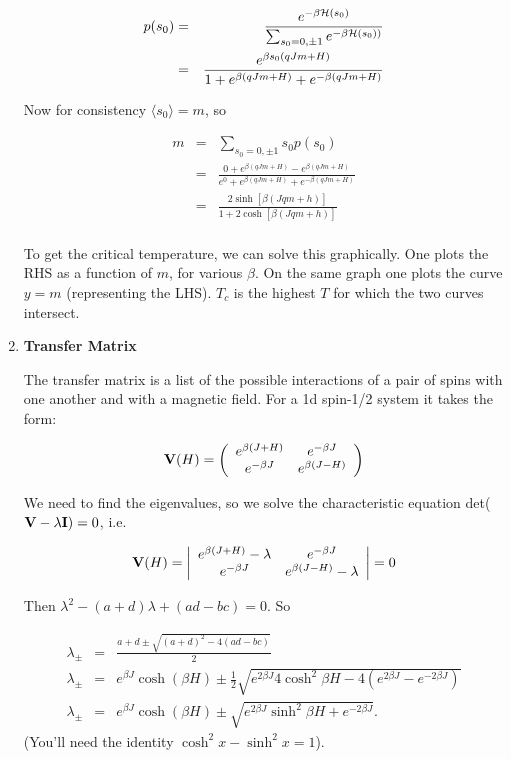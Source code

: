 \documentclass[a4paper,12pt,twoside]{article}
\begin{document}
\begin{enumerate}
\begin{eqnarray*}
p(s_0) &=& \frac{e^{-\beta{\cal H}(s_0)}} {\sum_{s_0=0,\pm 1}e^{-\beta{\cal H}(s_0))}}\\
&=&\frac{e^{\beta s_0(qJm+H)}}{1+e^{\beta(qJm+H)}+e^{-\beta(qJm+H)}}
\end{eqnarray*}

Now for consistency $\langle s_0\rangle=m$, so

\begin{eqnarray*}
m &=& \sum_{s_0=0,\pm 1}s_0p(s_0)\nonumber\\
 \:&=& \frac{0+e^{\beta(qJm+H)}-e^{\beta(qJm+H)}} {e^0+e^{\beta(qJm+H)}+e^{-\beta(qJm+H)}}\\
 \:&=&  \frac{2\sinh[\beta(Jqm+h)]}{1+2\cosh[\beta(Jqm+h)]}\\
\end{eqnarray*}

To get the critical temperature, we can solve this graphically. One plots
the RHS as a function of $m$, for various $\beta$. On the same graph one
plots the curve $y=m$ (representing the LHS). $T_c$ is the highest $T$ for which
the two curves intersect.

\item{\bf Transfer Matrix}

The transfer matrix is a list of the possible interactions of a pair
of spins with one another and with a magnetic field. For a 1d spin-1/2
system it takes the form:

\begin{equation}
{\bf V}(H)=\left(
\begin{array}{cc}
e^{\beta(J+H)} & e^{-\beta J} \\
e^{-\beta J}   & e^{\beta(J-H)}
\end{array} \right)
\end{equation}

We need to find the eigenvalues, so we solve
the characteristic equation det(${\bf V}-\lambda {\bf I})=0$, i.e.

\[
{\bf V}(H)=\left|
\begin{array}{cc}
e^{\beta(J+H)} -\lambda & e^{-\beta J} \\
e^{-\beta J}   & e^{\beta(J-H)}-\lambda
\end{array} \right| =0
\]

Then $\lambda^2-(a+d)\lambda+(ad-bc)=0$. So

\begin{eqnarray*}
\lambda_\pm &=& \frac{a+d\pm\sqrt{(a+d)^2-4(ad-bc)}}{2}\\
\lambda_{\pm} &=& e^{\beta J}\cosh(\beta H) \pm \frac{1}{2}\sqrt{e^{2\beta J}4\cosh^2\beta H-4(e^{2\beta J}-e^{-2\beta J})}\\
\lambda_{\pm} &=& e^{\beta J}\cosh(\beta H) \pm \sqrt{e^{2\beta J}\sinh^2\beta H+e^{-2\beta J}}.
\end{eqnarray*}
(You'll need the identity  $\cosh^2 x-\sinh^2 x = 1$).


\end{enumerate}
\end{document}
